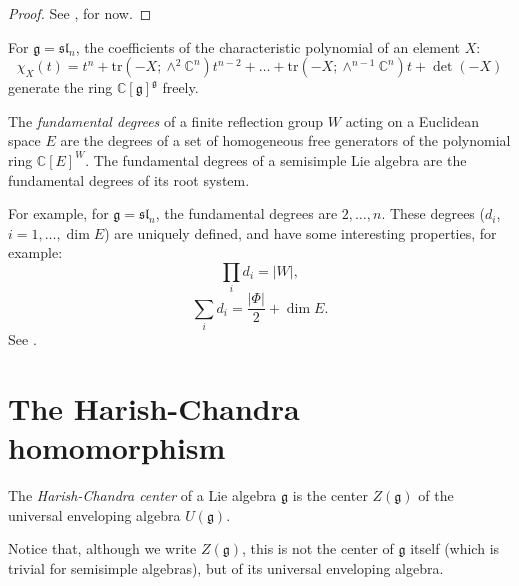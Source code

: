 \begin{proof}
 See \cite{Sternberg}, for now. 
\end{proof}

\begin{example}
 For $\mathfrak g= \mathfrak{sl}_n$, the coefficients of the characteristic polynomial of an element $X$:
 $$ \chi_X(t) = t^n + \text{tr}(-X; \wedge^2 \mathbb C^n) t^{n-2} + \dots + \text{tr}(-X; \wedge^{n-1} \mathbb C^n) t + \det(-X)$$
 generate the ring $\mathbb C[\mathfrak g]^{\mathfrak g}$ freely.
\end{example}


\begin{definition}
 \label{definition-fundamental-invariants}
 The {\it fundamental degrees} of a finite reflection group $W$ acting on a Euclidean space $E$ are the degrees of a set of homogeneous free generators of the polynomial ring $\mathbb C[E]^W$. The fundamental degrees of a semisimple Lie algebra are the fundamental degrees of its root system.
\end{definition}

For example, for $\mathfrak g=\mathfrak{sl}_n$, the fundamental degrees are $2, \dots, n$.
These degrees ($d_i$, $i=1, \dots, \dim E$) are uniquely defined, and have some interesting properties, for example: 
\begin{equation}
 \label{equation-degrees-product}
 \prod_i d_i = |W|,
\end{equation}
\begin{equation}
 \label{equation-degrees-sum}
 \sum_i d_i = \frac{|\Phi|}{2} + \dim E.
\end{equation}
See \cite[\S 3]{Humphreys-reflection}.


\section{The Harish-Chandra homomorphism}
\label{section-HC-homomorphism}

\begin{definition}
 \label{definition-HC-center}
The {\it Harish-Chandra center} of a Lie algebra $\mathfrak g$ is the center $Z(\mathfrak g)$ of the universal enveloping algebra $U(\mathfrak g)$.
\end{definition}

Notice that, although we write $Z(\mathfrak g)$, this is not the center of $\mathfrak g$ itself (which is trivial for semisimple algebras), but of its universal enveloping algebra. 

